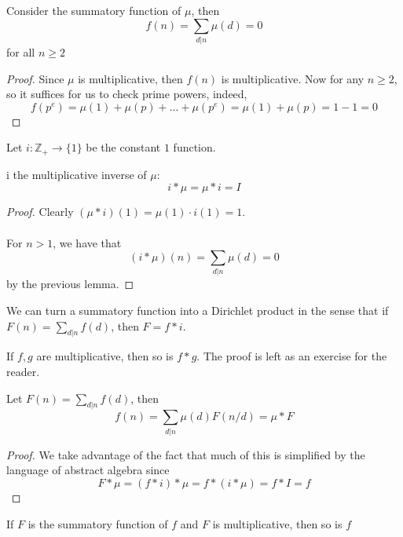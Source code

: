 \begin{lemma}
Consider the summatory function of $\mu$, then
\[f(n) = \sum_{d | n} \mu(d) = 0\]
for all $n \geq 2$
\end{lemma}

\begin{proof}
Since $\mu$ is multiplicative, then $f(n)$ is multiplicative. Now for any $n \geq 2$, so it suffices for us to check prime powers, indeed,
\[f(p^e) = \mu(1) + \mu(p) + ... + \mu(p^e) = \mu(1) + \mu(p) = 1 - 1 = 0\]
\end{proof}

\begin{definition}
Let $i: \mathbb{Z}_+ \to \{1\}$ be the constant $1$ function.
\end{definition}

\begin{lemma}
i the multiplicative inverse of $\mu$:
\[i * \mu = \mu * i = I\]
\end{lemma}

\begin{proof}
Clearly $(\mu * i)(1) = \mu(1) \cdot i(1) = 1$.\\\\
For $n > 1$, we have that
\[(i * \mu)(n) = \sum_{d | n} \mu(d) = 0\]
by the previous lemma.
\end{proof}

\begin{remark}
We can turn a summatory function into a Dirichlet product in the sense that if $F(n) = \sum_{d | n} f(d)$, then $F = f * i$.
\end{remark}

\begin{remark}
If $f, g$ are multiplicative, then so is $f * g$. The proof is left as an exercise for the reader.
\end{remark}

\begin{theorem}
Let $F(n) = \sum_{d | n} f(d)$, then
\[f(n) = \sum_{d | n} \mu(d)F(n / d) = \mu * F\]
\end{theorem}

\begin{proof}
We take advantage of the fact that much of this is simplified by the language of abstract algebra since
\[F * \mu = (f * i) * \mu = f * (i * \mu) = f * I = f\]
\end{proof}

\begin{corollary}
If $F$ is the summatory function of $f$ and $F$ is multiplicative, then so is $f$
\end{corollary}

